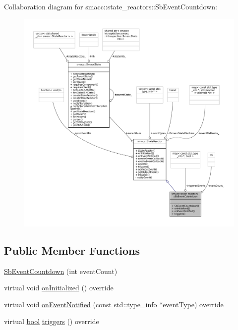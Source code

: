 Collaboration diagram for smacc\+:\+:state\+\_\+reactors\+:\+:Sb\+Event\+Countdown\+:
\nopagebreak
\begin{figure}[H]
\begin{center}
\leavevmode
\includegraphics[width=350pt]{classsmacc_1_1state__reactors_1_1SbEventCountdown__coll__graph}
\end{center}
\end{figure}
\subsection*{Public Member Functions}
\begin{DoxyCompactItemize}
\item 
\hyperlink{classsmacc_1_1state__reactors_1_1SbEventCountdown_a8bcd1e493d83203c8a8833ed315b3aae}{Sb\+Event\+Countdown} (int event\+Count)
\item 
virtual void \hyperlink{classsmacc_1_1state__reactors_1_1SbEventCountdown_a343020745d867db25230cec68a598c58}{on\+Initialized} () override
\item 
virtual void \hyperlink{classsmacc_1_1state__reactors_1_1SbEventCountdown_aa5b8c901a3b4e053367266e440861910}{on\+Event\+Notified} (const std\+::type\+\_\+info $\ast$event\+Type) override
\item 
virtual \hyperlink{classbool}{bool} \hyperlink{classsmacc_1_1state__reactors_1_1SbEventCountdown_a479b3092f191237ba42e08554b38c8bc}{triggers} () override
\end{DoxyCompactItemize}
